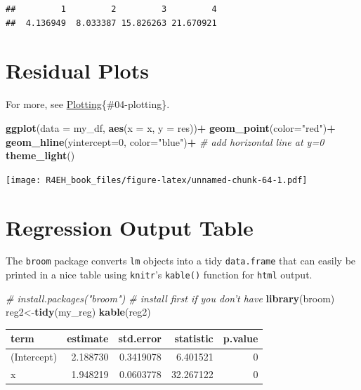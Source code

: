 \documentclass[]{book}
\newenvironment{Shaded}{\begin{snugshade}}{\end{snugshade}}
\newcommand{\KeywordTok}[1]{\textcolor[rgb]{0.13,0.29,0.53}{\textbf{#1}}}
\newcommand{\DataTypeTok}[1]{\textcolor[rgb]{0.13,0.29,0.53}{#1}}
\newcommand{\DecValTok}[1]{\textcolor[rgb]{0.00,0.00,0.81}{#1}}
\newcommand{\StringTok}[1]{\textcolor[rgb]{0.31,0.60,0.02}{#1}}
\newcommand{\CommentTok}[1]{\textcolor[rgb]{0.56,0.35,0.01}{\textit{#1}}}
\newcommand{\OperatorTok}[1]{\textcolor[rgb]{0.81,0.36,0.00}{\textbf{#1}}}
\newcommand{\NormalTok}[1]{#1}
\theoremstyle{definition}
\theoremstyle{definition}
\theoremstyle{definition}
\theoremstyle{remark}
\begin{document}
\begin{verbatim}
##         1         2         3         4 
##  4.136949  8.033387 15.826263 21.670921
\end{verbatim}

\section{Residual Plots}\label{residual-plots}

For more, see \protect\hyperlink{plotting}{Plotting}\{\#04-plotting\}.

\begin{Shaded}
\begin{Highlighting}[]
\KeywordTok{ggplot}\NormalTok{(}\DataTypeTok{data =}\NormalTok{ my_df, }\KeywordTok{aes}\NormalTok{(}\DataTypeTok{x =}\NormalTok{ x, }\DataTypeTok{y =}\NormalTok{ res))}\OperatorTok{+}
\StringTok{  }\KeywordTok{geom_point}\NormalTok{(}\DataTypeTok{color=}\StringTok{"red"}\NormalTok{)}\OperatorTok{+}
\StringTok{  }\KeywordTok{geom_hline}\NormalTok{(}\DataTypeTok{yintercept=}\DecValTok{0}\NormalTok{, }\DataTypeTok{color=}\StringTok{"blue"}\NormalTok{)}\OperatorTok{+}\StringTok{ }\CommentTok{# add horizontal line at y=0}
\StringTok{  }\KeywordTok{theme_light}\NormalTok{()}
\end{Highlighting}
\end{Shaded}

\texttt{[image: R4EH\_book\_files/figure-latex/unnamed-chunk-64-1.pdf]}

\section{Regression Output Table}\label{regression-output-table}

The \texttt{broom} package converts \texttt{lm} objects into a tidy
\texttt{data.frame} that can easily be printed in a nice table using
\texttt{knitr}'s \texttt{kable()} function for \texttt{html} output.

\begin{Shaded}
\begin{Highlighting}[]
\CommentTok{# install.packages("broom") # install first if you don't have }
\KeywordTok{library}\NormalTok{(broom)}
\NormalTok{reg2<-}\KeywordTok{tidy}\NormalTok{(my_reg)}
\KeywordTok{kable}\NormalTok{(reg2)}
\end{Highlighting}
\end{Shaded}

\begin{tabular}{l|r|r|r|r}
\hline
term & estimate & std.error & statistic & p.value\\
\hline
(Intercept) & 2.188730 & 0.3419078 & 6.401521 & 0\\
\hline
x & 1.948219 & 0.0603778 & 32.267122 & 0\\
\hline
\end{tabular}
\end{document}
